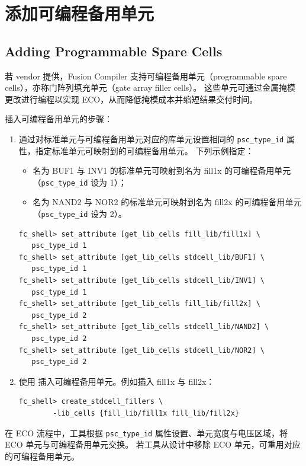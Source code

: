 \section{添加可编程备用单元}
\subsection*{Adding Programmable Spare Cells}

若 vendor 提供，Fusion Compiler 支持可编程备用单元（programmable spare cells），亦称门阵列填充单元（gate array filler cells）。
这些单元可通过金属掩模更改进行编程以实现 ECO，从而降低掩模成本并缩短结果交付时间。

插入可编程备用单元的步骤：
\begin{enumerate}
  \item 通过对标准单元与可编程备用单元对应的库单元设置相同的 \texttt{psc\_type\_id} 属性，指定标准单元可映射到的可编程备用单元。
  下列示例指定：
  \begin{itemize}
    \item 名为 BUF1 与 INV1 的标准单元可映射到名为 fill1x 的可编程备用单元（\texttt{psc\_type\_id} 设为 1）；
    \item 名为 NAND2 与 NOR2 的标准单元可映射到名为 fill2x 的可编程备用单元（\texttt{psc\_type\_id} 设为 2）。
  \end{itemize}
\begin{lstlisting}
fc_shell> set_attribute [get_lib_cells fill_lib/fill1x] \
   psc_type_id 1
fc_shell> set_attribute [get_lib_cells stdcell_lib/BUF1] \
   psc_type_id 1
fc_shell> set_attribute [get_lib_cells stdcell_lib/INV1] \
   psc_type_id 1
fc_shell> set_attribute [get_lib_cells fill_lib/fill2x] \
   psc_type_id 2
fc_shell> set_attribute [get_lib_cells stdcell_lib/NAND2] \
   psc_type_id 2
fc_shell> set_attribute [get_lib_cells stdcell_lib/NOR2] \
   psc_type_id 2
\end{lstlisting}
  \item 使用  插入可编程备用单元。例如插入 fill1x 与 fill2x：
\begin{lstlisting}
fc_shell> create_stdcell_fillers \
        -lib_cells {fill_lib/fill1x fill_lib/fill2x}
\end{lstlisting}
\end{enumerate}

在 ECO 流程中，工具根据 \texttt{psc\_type\_id} 属性设置、单元宽度与电压区域，将 ECO 单元与可编程备用单元交换。
若工具从设计中移除 ECO 单元，可重用对应的可编程备用单元。


